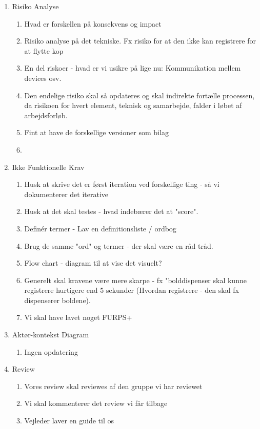 \begin{enumerate}
    \item Risiko Analyse
    \begin{enumerate}
        \item Hvad er forskellen på konsekvens og impact
        \item Risiko analyse på det tekniske. Fx risiko for at den ikke kan registrere for at flytte kop
        \item En del riskoer - hvad er vi usikre på lige nu: Kommunikation mellem devices osv.
        \item Den endelige risiko skal så opdateres og skal indirekte fortælle processen, da risikoen for hvert element, teknisk og samarbejde, falder i løbet af arbejdsforløb.
        \item Fint at have de forskellige versioner som bilag 
        \item 
    \end{enumerate}
    
    \item Ikke Funktionelle Krav
    \begin{enumerate} 
        \item Husk at skrive det er først iteration ved forskellige ting - så vi dokumenterer det iterative
        \item Husk at det skal testes - hvad indebærer det at "score". 
        \item Definér termer - Lav en definitionsliste / ordbog 
        \item Brug de samme "ord" og termer - der skal være en råd tråd. 
        \item Flow chart - diagram til at vise det visuelt? 
        \item Generelt skal kravene være mere skarpe - fx "bolddispenser skal kunne registrere hurtigere end 5 sekunder (Hvordan registrere - den skal fx dispenserer boldene).
        \item Vi skal have lavet noget FURPS+ 
    \end{enumerate}
    
    \item Aktør-kontekst Diagram
    \begin{enumerate}
        \item Ingen opdatering 
    \end{enumerate}
    
    \item Review
    \begin{enumerate}
        \item Vores review skal reviewes af den gruppe vi har reviewet 
        \item Vi skal kommenterer det review vi får tilbage 
        \item Vejleder laver en guide til os 
    \end{enumerate}
\end{enumerate}